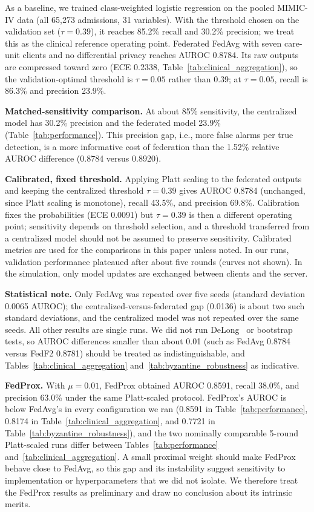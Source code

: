 \documentclass[journal]{IEEEtran}
\begin{document}
As a baseline, we trained class-weighted logistic regression on the pooled MIMIC-IV data (all 65,273 admissions, 31 variables). With the threshold chosen on the validation set ($\tau=0.39$), it reaches 85.2\% recall and 30.2\% precision; we treat this as the clinical reference operating point. Federated FedAvg with seven care-unit clients and no differential privacy reaches AUROC 0.8784. Its raw outputs are compressed toward zero (ECE 0.2338, Table~\ref{tab:clinical_aggregation}), so the validation-optimal threshold is $\tau=0.05$ rather than 0.39; at $\tau=0.05$, recall is 86.3\% and precision 23.9\%.

\textbf{Matched-sensitivity comparison.} At about 85\% sensitivity, the centralized model has 30.2\% precision and the federated model 23.9\% (Table~\ref{tab:performance}). This precision gap, i.e., more false alarms per true detection, is a more informative cost of federation than the 1.52\% relative AUROC difference (0.8784 versus 0.8920).

\textbf{Calibrated, fixed threshold.} Applying Platt scaling to the federated outputs and keeping the centralized threshold $\tau=0.39$ gives AUROC 0.8784 (unchanged, since Platt scaling is monotone), recall 43.5\%, and precision 69.8\%. Calibration fixes the probabilities (ECE 0.0091) but $\tau=0.39$ is then a different operating point; sensitivity depends on threshold selection, and a threshold transferred from a centralized model should not be assumed to preserve sensitivity. Calibrated metrics are used for the comparisons in this paper unless noted. In our runs, validation performance plateaued after about five rounds (curves not shown). In the simulation, only model updates are exchanged between clients and the server.

\textbf{Statistical note.} Only FedAvg was repeated over five seeds (standard deviation 0.0065 AUROC); the centralized-versus-federated gap (0.0136) is about two such standard deviations, and the centralized model was not repeated over the same seeds. All other results are single runs. We did not run DeLong~\cite{delong1988comparing} or bootstrap tests, so AUROC differences smaller than about 0.01 (such as FedAvg 0.8784 versus FedF2 0.8781) should be treated as indistinguishable, and Tables~\ref{tab:clinical_aggregation} and~\ref{tab:byzantine_robustness} as indicative.

\textbf{FedProx.} With $\mu=0.01$, FedProx obtained AUROC 0.8591, recall 38.0\%, and precision 63.0\% under the same Platt-scaled protocol. FedProx's AUROC is below FedAvg's in every configuration we ran (0.8591 in Table~\ref{tab:performance}, 0.8174 in Table~\ref{tab:clinical_aggregation}, and 0.7721 in Table~\ref{tab:byzantine_robustness}), and the two nominally comparable 5-round Platt-scaled runs differ between Tables~\ref{tab:performance} and~\ref{tab:clinical_aggregation}. A small proximal weight should make FedProx behave close to FedAvg, so this gap and its instability suggest sensitivity to implementation or hyperparameters that we did not isolate. We therefore treat the FedProx results as preliminary and draw no conclusion about its intrinsic merits.
\end{document}
